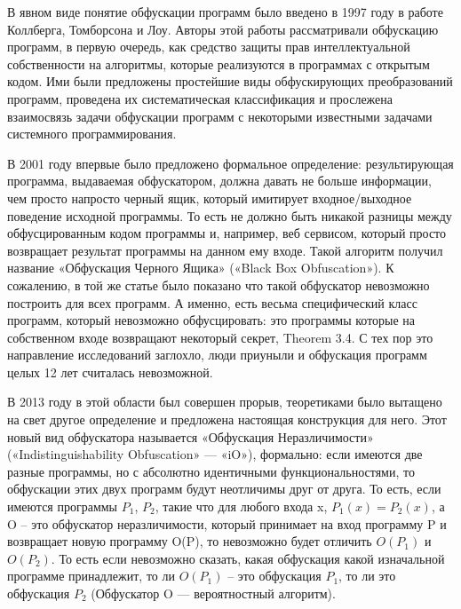 В явном виде понятие обфускации программ было введено в 1997 году в работе Коллберга, Томборсона и Лоу\cite{Cit2}. Авторы этой работы рассматривали обфускацию программ, в первую очередь, как средство защиты прав интеллектуальной собственности на алгоритмы, которые реализуются в программах с открытым кодом. Ими были предложены простейшие виды обфускирующих преобразований программ, проведена их систематическая классификация и прослежена взаимосвязь задачи обфускации программ с некоторыми известными задачами системного программирования.

В 2001\cite{Cit3} году впервые было предложено формальное определение: результирующая программа, выдаваемая обфускатором, должна давать не больше информации, чем просто напросто черный ящик, который имитирует входное/выходное поведение исходной программы. То есть не должно быть никакой разницы между обфусцированным кодом программы и, например, веб сервисом, который просто возвращает результат программы на данном ему входе. Такой алгоритм получил название «Обфускация Черного Ящика» («Black Box Obfuscation»). К сожалению, в той же статье было показано что такой обфускатор невозможно построить для всех программ. А именно, есть весьма специфический класс программ, который невозможно обфусцировать: это программы которые на собственном входе возвращают некоторый секрет\cite{Cit3}, Theorem 3.4. С тех пор это направление исследований заглохло, люди приуныли и обфускация программ целых 12 лет считалась невозможной.

В 2013\cite{Cit4} году в этой области был совершен прорыв, теоретиками было вытащено на свет другое определение и предложена настоящая конструкция для него. Этот новый вид обфускатора называется «Обфускация Неразличимости» («Indistinguishability Obfuscation» — «iO»), формально: если имеются две разные программы, но с абсолютно идентичными функциональностями, то обфускации этих двух программ будут неотличимы друг от друга. То есть, если имеются программы $P_1$, $P_2$, такие что для любого входа x, $P_1(x) = P_2(x)$, а O -- это обфускатор неразличимости, который принимает на вход программу P и возвращает новую программу O(P), то невозможно будет отличить $O(P_1)$ и $O(P_2)$. То есть если невозможно сказать, какая обфускация какой изначальной программе принадлежит, то ли $O(P_1)$ -- это обфускация $P_1$, то ли это обфускация $P_2$ (Обфускатор O — вероятностный алгоритм).

